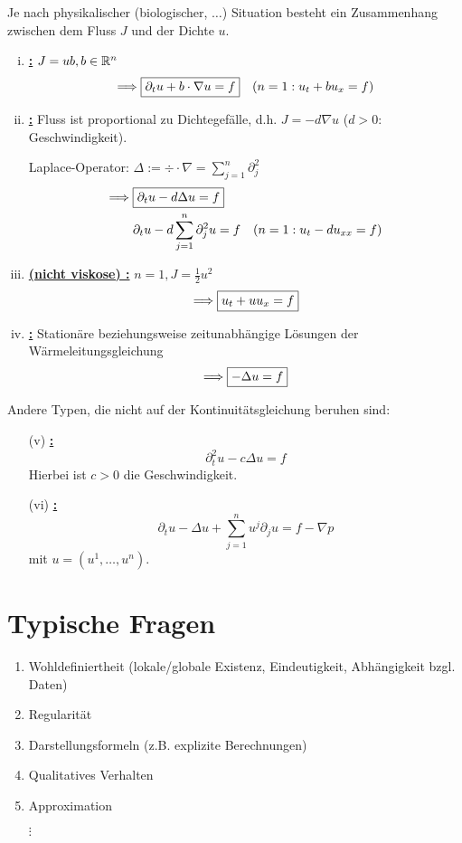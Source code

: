 Je nach physikalischer (biologischer, $\ldots$) Situation besteht ein Zusammenhang zwischen dem Fluss $J$ und der Dichte $u$.

\begin{enumerate}[(i)]
\item \underline{\textbf{:}} $J=ub, b\in\mathbb{R}^n$
\[ \Longrightarrow \boxed{\partial_t u+b\cdot \nabla u=f}\quad (n=1: u_t+bu_x=f)\]
\item \underline{\textbf{:}} Fluss ist proportional zu Dichtegefälle, d.h. $J=-d\nabla u$ ($d>0$: Geschwindigkeit).

Laplace-Operator: $\Delta := \div\cdot\nabla = \sum\limits_{j=1}^n\partial_j^2$
\begin{align*}
 \Longrightarrow\; & \boxed{\partial_tu-d\Delta u=f} \\
  & \partial_tu-d\sum\limits_{j=1}^n\partial_j^2 u=f\quad (n=1: u_t-du_{xx}=f)
\end{align*}
\item \underline{\textbf{(nicht viskose) :}} $n=1, J=\frac 1 2 u^2$
\[ \Longrightarrow \boxed{u_t+uu_x=f} \]

\item \underline{\textbf{:}} Stationäre beziehungsweise zeitunabhängige Lös\-ung\-en der Wär\-me\-lei\-tungs\-glei\-chung
\[ \Longrightarrow \boxed{-\Delta u=f} \]
\end{enumerate}

Andere Typen, die nicht auf der Kontinuitätsgleichung beruhen sind:

\begin{enumerate}
\item[(v)] \underline{\textbf{:}}
\[ \boxed{\partial_t^2u-c\Delta u=f} \]
Hierbei ist $c>0$ die Geschwindigkeit.

\item[(vi)] \underline{\textbf{:}}
\[ \boxed{\partial_tu-\Delta u+\sum\limits_{j=1}^nu^j\partial_j u=f-\nabla p} \]
 mit $u=(u^1,\ldots,u^n)$.
\end{enumerate}

\section{Typische Fragen}

\begin{enumerate}[1.]
\item Wohldefiniertheit (lokale/globale Existenz, Eindeutigkeit, Abhängigkeit bzgl. Daten)
\item Regularität
\item Darstellungsformeln (z.B. explizite Berechnungen)
\item Qualitatives Verhalten
\item Approximation
\item[$\vdots$]
\end{enumerate}

